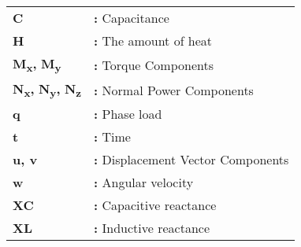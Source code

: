 
\begin{tabular}{p{2cm}l}
{\bf{C}} & {\bf:} Capacitance\\
{\bf H} & {\bf:} The amount of heat\\
{\bf M\textsubscript{x},} {\bf M\textsubscript{y}} & {\bf:} Torque Components\\
{\bf N\textsubscript{x},} {\bf N\textsubscript{y},} {\bf N\textsubscript{z}} & {\bf:} Normal Power Components\\
{\bf q} & {\bf:} Phase load\\
{\bf t} & {\bf:} Time\\
{\bf u, v} & {\bf:} Displacement Vector Components\\
{\bf w} & {\bf:} Angular velocity\\
{\bf XC} & {\bf:} Capacitive reactance\\
{\bf XL} & {\bf:}  Inductive reactance\\
\end{tabular}

